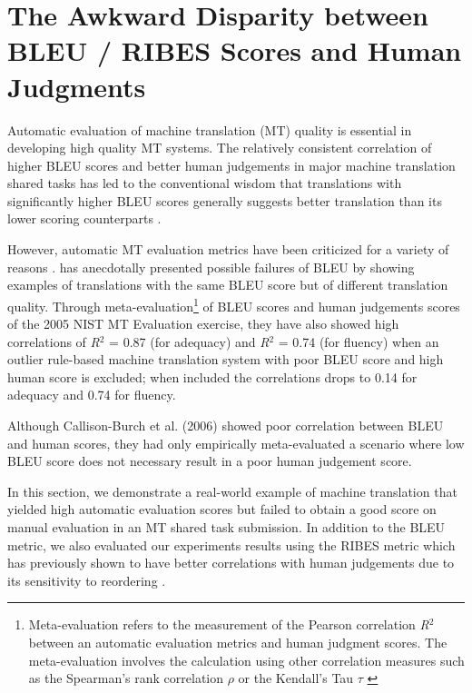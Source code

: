 \section{The Awkward Disparity between BLEU / RIBES Scores and
Human Judgments}

Automatic evaluation of machine translation (MT) quality is essential in developing high quality MT systems. 
The relatively consistent correlation of higher BLEU scores \citep{papineni2002bleu} and better human judgements in major machine translation shared tasks has led to the conventional wisdom that translations with significantly higher BLEU scores generally suggests better translation than its lower scoring counterparts \citep{bojar2014findings,WMT15,nakazawa2014overview,cettolo2014report}. 

However, automatic MT evaluation metrics have been criticized for a variety of reasons \citep{babych2004extending,callison2006re}.
\cite{callison2006re} has anecdotally presented possible failures of BLEU by showing examples of translations with the same BLEU score but of different translation quality. Through meta-evaluation\footnote{Meta-evaluation refers to the measurement of the Pearson correlation \emph{R$^2$} between an automatic evaluation metrics and human judgment scores. The meta-evaluation involves the calculation using other correlation measures such as the Spearman's rank correlation $\rho$ \citep{callison2007meta} or the Kendall's Tau $\tau$ \citep{WMT15-metric,graham-baldwin2015}} of BLEU scores and human judgements scores of the 2005 NIST MT Evaluation exercise, they have also showed high correlations of \emph{R$^2$} = 0.87 (for adequacy) and \emph{R$^2$} = 0.74 (for fluency) when an outlier rule-based machine translation system with poor BLEU score and high human score is excluded; when included the correlations drops to 0.14 for adequacy and 0.74 for fluency.


Although Callison-Burch et al. (2006) showed  poor correlation between BLEU and human scores, they had only empirically meta-evaluated a scenario where low BLEU score does not necessary result in a poor human judgement score. 

In this section, we demonstrate a real-world example of machine translation that yielded high automatic evaluation scores but failed to obtain a good score on manual evaluation in an MT shared task submission. In addition to the BLEU metric, we also evaluated our experiments results using the RIBES metric which has previously shown to have better correlations with human judgements due to its sensitivity to reordering \citep{isozaki2010automatic}. 

